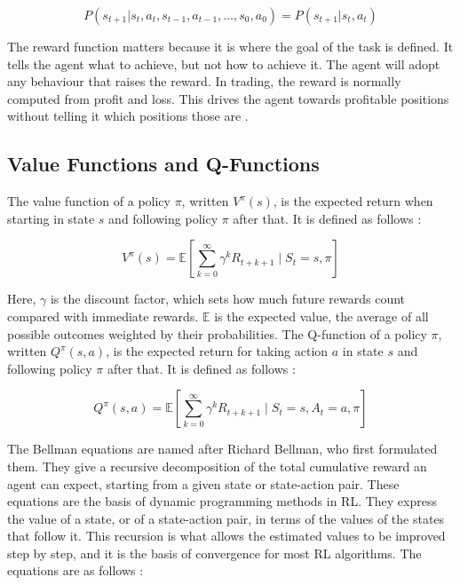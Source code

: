 \begin{equation}
\label{Equation:MarkovProperty}
P(s_{t+1} | s_t, a_t, s_{t-1}, a_{t-1}, \ldots, s_0, a_0) = P(s_{t+1} | s_t, a_t)
\end{equation}

The reward function matters because it is where the goal of the task is defined. It tells the agent what to achieve, but not how to achieve it. The agent will adopt any behaviour that raises the reward. In trading, the reward is normally computed from profit and loss. This drives the agent towards profitable positions without telling it which positions those are \cite{sutton_reinforcement_2018}.

\subsection{Value Functions and Q-Functions}

The value function of a policy \( \pi \), written \( V^\pi(s) \), is the expected return when starting in state \( s \) and following policy \( \pi \) after that. It is defined as follows \cite{sutton_reinforcement_2018}:

\begin{equation}
V^\pi(s) = \mathbb{E} \left[ \sum_{k=0}^{\infty} \gamma^k R_{t+k+1} \mid S_t = s, \pi \right]
\end{equation}

Here, \( \gamma \) is the discount factor, which sets how much future rewards count compared with immediate rewards. \( \mathbb{E} \) is the expected value, the average of all possible outcomes weighted by their probabilities. The Q-function of a policy \( \pi \), written \( Q^\pi(s, a) \), is the expected return for taking action \( a \) in state \( s \) and following policy \( \pi \) after that. It is defined as follows \cite{sutton_reinforcement_2018}:

\begin{equation}
Q^\pi(s, a) = \mathbb{E} \left[ \sum_{k=0}^{\infty} \gamma^k R_{t+k+1} \mid S_t = s, A_t = a, \pi \right]
\end{equation}

The Bellman equations are named after Richard Bellman, who first formulated them. They give a recursive decomposition of the total cumulative reward an agent can expect, starting from a given state or state-action pair. These equations are the basis of dynamic programming methods in RL. They express the value of a state, or of a state-action pair, in terms of the values of the states that follow it. This recursion is what allows the estimated values to be improved step by step, and it is the basis of convergence for most RL algorithms. The equations are as follows \cite{sutton_reinforcement_2018}:

